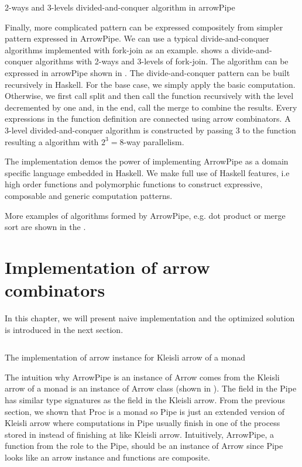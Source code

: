 \begin{listing}[ht]
    \inputminted{Haskell}{arrow/dq.hs}
    \caption{2-ways and 3-levels divided-and-conquer algorithm in arrowPipe}
    \label{arrowPipe:dq}
\end{listing}
Finally, more complicated pattern can be expressed compositely from simpler pattern expressed in ArrowPipe. We can use a typical divide-and-conquer algorithms implemented with fork-join as an example.  shows a divide-and-conquer algorithms with 2-ways and 3-levels of fork-join. The algorithm can be expressed in arrowPipe shown in . The divide-and-conquer pattern can be built recursively in Haskell. For the base case, we simply apply the basic computation. Otherwise, we first call split and then call the function recursively with the level decremented by one and, in the end, call the merge to combine the results. Every expressions in the function definition are connected using arrow combinators. A 3-level divided-and-conquer algorithm is constructed by passing 3 to the function resulting a algorithm with $2^3 = 8$-way parallelism.

The implementation demos the power of implementing ArrowPipe as a domain specific language embedded in Haskell. We make full use of Haskell features, i.e high order functions and polymorphic functions to construct expressive, composable and generic computation patterns.

More examples of algorithms formed by ArrowPipe, e.g. dot product or merge sort are shown in the .
\section{Implementation of arrow combinators} \label{arrowPipe:impl}
In this chapter, we will present naive implementation and the optimized solution is introduced in the next section.

\begin{listing}[ht]
    \inputminted{Haskell}{arrow/kleisli.hs} 
    \caption{The implementation of arrow instance for Kleisli arrow of a monad}
    \label{arrow:code:kleisli}
\end{listing}
The intuition why ArrowPipe is an instance of Arrow comes from the Kleisli arrow of a monad is an instance of Arrow class (shown in ). The  field in the Pipe has similar type signatures as the  field in the Kleisli arrow. From the previous section, we shown that Proc is a monad so Pipe is just an extended version of Kleisli arrow where computations in Pipe usually finish in one of the process stored in  instead of finishing at  like Kleisli arrow. Intuitively, ArrowPipe, a function from the role to the Pipe, should be an instance of Arrow since Pipe looks like an arrow instance and functions are composite.

